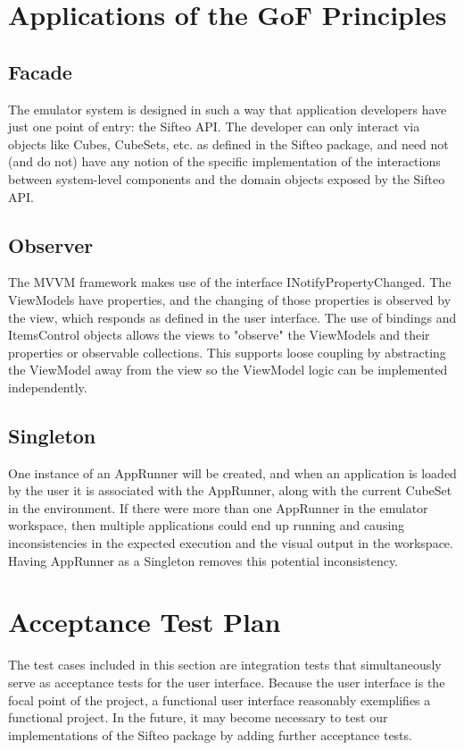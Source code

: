 \documentclass[12pt]{article}
\begin{document}


\section{Applications of the GoF Principles}

\subsection{Facade}
The emulator system is designed in such a way that application developers have just one point of entry: the Sifteo API. The developer can only interact via objects like Cubes, CubeSets, etc. as defined in the Sifteo package, and need not (and do not) have any notion of the specific implementation of the interactions between system-level components and the domain objects exposed by the Sifteo API.

\subsection{Observer}
The MVVM framework makes use of the interface INotifyPropertyChanged. The ViewModels have properties, and the changing of those properties is observed by the view, which responds as defined in the user interface. The use of bindings and ItemsControl objects allows the views to "observe" the ViewModels and their properties or observable collections. This supports loose coupling by abstracting the ViewModel away from the view so the ViewModel logic can be implemented independently.

\subsection{Singleton}
One instance of an AppRunner will be created, and when an application is loaded by the user it is associated with the AppRunner, along with the current CubeSet in the environment. If there were more than one AppRunner in the emulator workspace, then multiple applications could end up running and causing inconsistencies in the expected execution and the visual output in the workspace. Having AppRunner as a Singleton removes this potential inconsistency.

\clearpage

\section{Acceptance Test Plan}
The test cases included in this section are integration tests that simultaneously serve as acceptance tests for the user interface. Because the user interface is the focal point of the project, a functional user interface reasonably exemplifies a functional project. In the future, it may become necessary to test our implementations of the Sifteo package by adding further acceptance tests.
\end{document}
